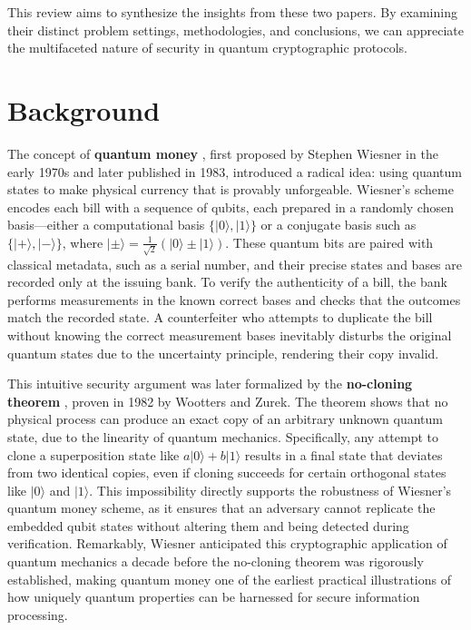 \documentclass{article} %
\begin{document}
This review aims to synthesize the insights from these two papers. By examining their distinct problem settings, methodologies, and conclusions, we can appreciate the multifaceted nature of security in quantum cryptographic protocols.

\newpage
\color{black}
\section{Background}

The concept of \textbf{quantum money} \citep{Wiesner1983Conjugate}, first proposed by Stephen Wiesner in the early 1970s and later published in 1983, introduced a radical idea: using quantum states to make physical currency that is provably unforgeable. Wiesner's scheme encodes each bill with a sequence of qubits, each prepared in a randomly chosen basis---either a computational basis $\{|0\rangle, |1\rangle\}$ or a conjugate basis such as $\{|+\rangle, |-\rangle\}$, where $|\pm\rangle = \frac{1}{\sqrt{2}}(|0\rangle \pm |1\rangle)$. These quantum bits are paired with classical metadata, such as a serial number, and their precise states and bases are recorded only at the issuing bank. To verify the authenticity of a bill, the bank performs measurements in the known correct bases and checks that the outcomes match the recorded state. A counterfeiter who attempts to duplicate the bill without knowing the correct measurement bases inevitably disturbs the original quantum states due to the uncertainty principle, rendering their copy invalid. 

This intuitive security argument was later formalized by the \textbf{no-cloning theorem} \citep{WoottersZurek1982Single}, proven in 1982 by Wootters and Zurek. The theorem shows that no physical process can produce an exact copy of an arbitrary unknown quantum state, due to the linearity of quantum mechanics. Specifically, any attempt to clone a superposition state like $a|0\rangle + b|1\rangle$ results in a final state that deviates from two identical copies, even if cloning succeeds for certain orthogonal states like $|0\rangle$ and $|1\rangle$. This impossibility directly supports the robustness of Wiesner’s quantum money scheme, as it ensures that an adversary cannot replicate the embedded qubit states without altering them and being detected during verification. Remarkably, Wiesner anticipated this cryptographic application of quantum mechanics a decade before the no-cloning theorem was rigorously established, making quantum money one of the earliest practical illustrations of how uniquely quantum properties can be harnessed for secure information processing.
\end{document}
